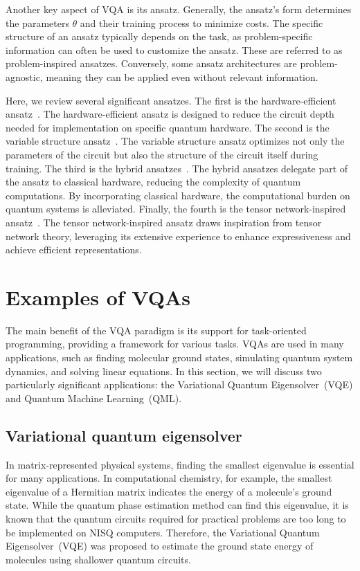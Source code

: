 \documentclass[12pt,dvipdfmx,twoside,openright]{report}
\begin{document}
Another key aspect of VQA is its ansatz. 
Generally, the ansatz's form determines the parameters $\theta$ and their training process to minimize costs. 
The specific structure of an ansatz typically depends on the task, as problem-specific information can often be used to customize the ansatz. 
These are referred to as problem-inspired ansatzes.
Conversely, some ansatz architectures are problem-agnostic, meaning they can be applied even without relevant information.

Here, we review several significant ansatzes. 
The first is the hardware-efficient ansatz~\cite{ansatz-hardware}. 
The hardware-efficient ansatz is designed to reduce the circuit depth needed for implementation on specific quantum hardware.
The second is the variable structure ansatz~\cite{ansatz-variable}. 
The variable structure ansatz optimizes not only the parameters of the circuit but also the structure of the circuit itself during training.
The third is the hybrid ansatzes~\cite{ansatz-hybrid}. 
The hybrid ansatzes delegate part of the ansatz to classical hardware, reducing the complexity of quantum computations. By incorporating classical hardware, the computational burden on quantum systems is alleviated. 
Finally, the fourth is the tensor network-inspired ansatz~\cite{ansatz-tensor1,ansatz-tensor2}.
The tensor network-inspired ansatz draws inspiration from tensor network theory, leveraging its extensive experience to enhance expressiveness and achieve efficient representations.


\section{Examples of VQAs}
The main benefit of the VQA paradigm is its support for task-oriented programming, providing a framework for various tasks. 
VQAs are used in many applications, such as finding molecular ground states, simulating quantum system dynamics, and solving linear equations.
In this section, we will discuss two particularly significant applications: the Variational Quantum Eigensolver~(VQE) and Quantum Machine Learning~(QML).

\subsection{Variational quantum eigensolver}
In matrix-represented physical systems, finding the smallest eigenvalue is essential for many applications. 
In computational chemistry, for example, the smallest eigenvalue of a Hermitian matrix indicates the energy of a molecule's ground state. 
While the quantum phase estimation method can find this eigenvalue, it is known that the quantum circuits required for practical problems are too long to be implemented on NISQ computers.
Therefore, the Variational Quantum Eigensolver~(VQE) was proposed to estimate the ground state energy of molecules using shallower quantum circuits.
\end{document}
